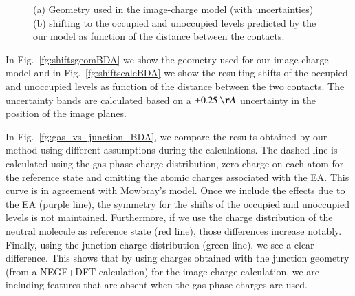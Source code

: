 \documentclass[aip,jcp,a4paper,reprint,floatfix,superscriptaddress]{revtex4-1}
\begin{document}
\begin{figure}
\caption{(a) Geometry used in the image-charge model (with uncertainties) (b) shifting  to  the occupied and unoccupied levels predicted by the our model as function of the distance between the contacts.
}\label{fg:contactsBDA}
\end{figure}

In Fig.~\ref{fg:shiftsgeomBDA} we show the geometry used for our image-charge model and in Fig.~\ref{fg:shiftscalcBDA} we show the resulting shifts of the occupied and unoccupied levels as function of the distance between the two contacts. The uncertainty bands are calculated based on a $\pm0.25\ \AA$ uncertainty in the position of the image planes.

In Fig.~\ref{fg:gas_vs_junction_BDA}, we compare the results obtained by our method using different assumptions during the calculations. The dashed line is calculated using the gas phase charge distribution, zero charge on each atom for the reference state and omitting the atomic charges associated with the EA. This curve is in agreement with Mowbray's model. Once we include the effects due to the EA (purple line), the symmetry for the shifts of the occupied and unoccupied levels is not maintained. Furthermore, if we use the charge distribution of the neutral molecule as reference state (red line), those differences increase notably. Finally, using the junction charge distribution (green line), we see a clear difference. This shows that by using charges obtained with the junction geometry (from a NEGF+DFT calculation) for the image-charge calculation, we are including features that are absent when the gas phase charges are used.
\end{document}
